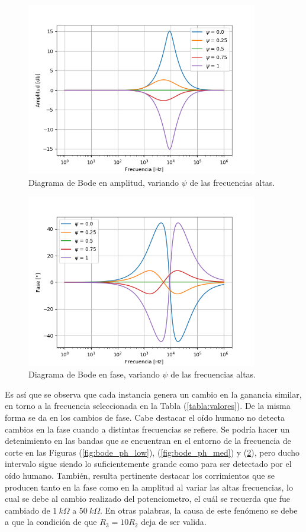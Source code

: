 \documentclass[a4paper]{article}
\begin{document}
\begin{figure}[H]
\centering
	\includegraphics[width=0.9\textwidth]{Imagenes/High-psi-bode.png}
	\caption{Diagrama de Bode en amplitud, variando $\psi$ de las frecuencias altas.}
	\label{fig:bode_modulo_high}
\end{figure}
\begin{figure}[H]
\centering
	\includegraphics[width=0.9\textwidth]{Imagenes/High-psi-ph.png}
	\caption{Diagrama de Bode en fase, variando $\psi$ de las frecuencias altas.}
	\label{fig:bode_ph_high}
\end{figure}

Es así que se observa que cada instancia genera un cambio en la ganancia similar, en torno a la frecuencia seleccionada en la Tabla (\ref{tabla:valores}). De la misma forma se da en los cambios de fase. Cabe destacar el oído humano no detecta cambios en la fase cuando a distintas frecuencias se refiere. Se podría hacer un detenimiento en las bandas que se encuentran en el entorno de la frecuencia de corte en las Figuras (\ref{fig:bode_ph_low}), (\ref{fig:bode_ph_med}) y (\ref{fig:bode_ph_high}), pero ducho intervalo sigue siendo lo suficientemente grande como para ser detectado por el oído humano. También, resulta pertinente destacar los corrimientos que se producen tanto en la fase como en la amplitud al variar las altas frecuencias, lo cual se debe al cambio realizado del potenciometro, el cuál se recuerda que fue cambiado de $1 \ k\Omega$ a $50 \ k\Omega$. En otras palabras, la causa de este fenómeno se debe a que la condición de que $R_3 = 10R_2$ deja de ser valida.
\end{document}
